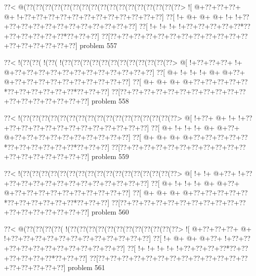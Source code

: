 \vbox{\vbox{\goo
\0??<\- @(\0??(\0??(\0??(\0??(\0??(\0??(\0??(\0??(\0??(\0??(\0??(\0??(\0??(\0??(\0??(\0??(\0??>
\- ![\- @+\0??+\0??+\0??+\- @+\- !+\0??+\0??+\0??+\0??+\0??+\0??+\0??+\0??+\0??+\0??+\0??+\0??]
\0??[\- !+\- @+\- @+\- @+\- !+\- !+\0??+\0??+\0??+\0??+\0??+\0??+\0??+\0??+\0??+\0??+\0??+\0??]
\0??[\- !+\- !+\- !+\- !+\0??+\0??+\0??+\0??+\0??*\0??+\0??+\0??+\0??+\0??+\0??*\0??+\0??+\0??]
\0??[\0??+\0??+\0??+\0??+\0??+\0??+\0??+\0??+\0??+\0??+\0??+\0??+\0??+\0??+\0??+\0??+\0??+\0??]
}
\hfil problem 557\hfil\break
}



\vbox{\vbox{\goo
\0??<\- !(\0??(\0??(\- !(\0??(\- !(\0??(\0??(\0??(\0??(\0??(\0??(\0??(\0??(\0??(\0??(\0??(\0??>
\- @[\- !+\0??+\0??+\0??+\- !+\- @+\0??+\0??+\0??+\0??+\0??+\0??+\0??+\0??+\0??+\0??+\0??+\0??]
\0??[\- @+\- !+\- !+\- !+\- @+\- @+\0??+\- @+\0??+\0??+\0??+\0??+\0??+\0??+\0??+\0??+\0??+\0??]
\0??[\- @+\- @+\- @+\- @+\0??+\0??+\0??+\0??+\0??*\0??+\0??+\0??+\0??+\0??+\0??*\0??+\0??+\0??]
\0??[\0??+\0??+\0??+\0??+\0??+\0??+\0??+\0??+\0??+\0??+\0??+\0??+\0??+\0??+\0??+\0??+\0??+\0??]
}
\hfil problem 558\hfil\break
}



\vbox{\vbox{\goo
\0??<\- !(\0??(\0??(\0??(\0??(\0??(\0??(\0??(\0??(\0??(\0??(\0??(\0??(\0??(\0??(\0??(\0??(\0??>
\- @[\- !+\0??+\- @+\- !+\- !+\0??+\0??+\0??+\0??+\0??+\0??+\0??+\0??+\0??+\0??+\0??+\0??+\0??]
\0??[\- @+\- !+\- !+\- !+\- @+\- @+\0??+\- @+\0??+\0??+\0??+\0??+\0??+\0??+\0??+\0??+\0??+\0??]
\0??[\- @+\- @+\- @+\- @+\0??+\0??+\0??+\0??+\0??*\0??+\0??+\0??+\0??+\0??+\0??*\0??+\0??+\0??]
\0??[\0??+\0??+\0??+\0??+\0??+\0??+\0??+\0??+\0??+\0??+\0??+\0??+\0??+\0??+\0??+\0??+\0??+\0??]
}
\hfil problem 559\hfil\break
}



\vbox{\vbox{\goo
\0??<\- !(\0??(\0??(\0??(\0??(\0??(\0??(\0??(\0??(\0??(\0??(\0??(\0??(\0??(\0??(\0??(\0??(\0??>
\- @[\- !+\- !+\- @+\0??+\- !+\0??+\0??+\0??+\0??+\0??+\0??+\0??+\0??+\0??+\0??+\0??+\0??+\0??]
\0??[\- @+\- !+\- !+\- !+\- @+\- @+\0??+\- @+\0??+\0??+\0??+\0??+\0??+\0??+\0??+\0??+\0??+\0??]
\0??[\- @+\- @+\- @+\- @+\0??+\0??+\0??+\0??+\0??*\0??+\0??+\0??+\0??+\0??+\0??*\0??+\0??+\0??]
\0??[\0??+\0??+\0??+\0??+\0??+\0??+\0??+\0??+\0??+\0??+\0??+\0??+\0??+\0??+\0??+\0??+\0??+\0??]
}
\hfil problem 560\hfil\break
}



\vbox{\vbox{\goo
\0??<\- @(\0??(\0??(\0??(\0??(\- !(\0??(\0??(\0??(\0??(\0??(\0??(\0??(\0??(\0??(\0??(\0??(\0??>
\- ![\- @+\0??+\0??+\0??+\- @+\- !+\0??+\0??+\0??+\0??+\0??+\0??+\0??+\0??+\0??+\0??+\0??+\0??]
\0??[\- !+\- @+\- @+\- @+\0??+\- !+\0??+\0??+\0??+\0??+\0??+\0??+\0??+\0??+\0??+\0??+\0??+\0??]
\0??[\- !+\- !+\- !+\- !+\- !+\0??+\0??+\0??+\0??*\0??+\0??+\0??+\0??+\0??+\0??*\0??+\0??+\0??]
\0??[\0??+\0??+\0??+\0??+\0??+\0??+\0??+\0??+\0??+\0??+\0??+\0??+\0??+\0??+\0??+\0??+\0??+\0??]
}
\hfil problem 561\hfil\break
}



